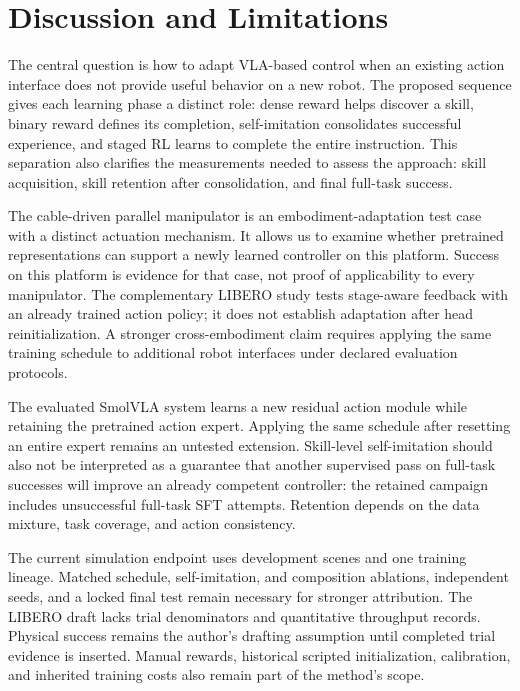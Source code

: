 \section{Discussion and Limitations}\label{sec:discussion}
The central question is how to adapt VLA-based control when an existing action interface does not provide useful behavior on a new robot. The proposed sequence gives each learning phase a distinct role: dense reward helps discover a skill, binary reward defines its completion, self-imitation consolidates successful experience, and staged RL learns to complete the entire instruction. This separation also clarifies the measurements needed to assess the approach: skill acquisition, skill retention after consolidation, and final full-task success.

The cable-driven parallel manipulator is an embodiment-adaptation test case with a distinct actuation mechanism. It allows us to examine whether pretrained representations can support a newly learned controller on this platform. Success on this platform is evidence for that case, not proof of applicability to every manipulator. The complementary LIBERO study tests stage-aware feedback with an already trained action policy; it does not establish adaptation after head reinitialization. A stronger cross-embodiment claim requires applying the same training schedule to additional robot interfaces under declared evaluation protocols.

The evaluated SmolVLA system learns a new residual action module while retaining the pretrained action expert. Applying the same schedule after resetting an entire expert remains an untested extension. Skill-level self-imitation should also not be interpreted as a guarantee that another supervised pass on full-task successes will improve an already competent controller: the retained campaign includes unsuccessful full-task SFT attempts. Retention depends on the data mixture, task coverage, and action consistency.

The current simulation endpoint uses development scenes and one training lineage. Matched schedule, self-imitation, and composition ablations, independent seeds, and a locked final test remain necessary for stronger attribution. The LIBERO draft lacks trial denominators and quantitative throughput records. Physical success remains the author's drafting assumption until completed trial evidence is inserted. Manual rewards, historical scripted initialization, calibration, and inherited training costs also remain part of the method's scope.
